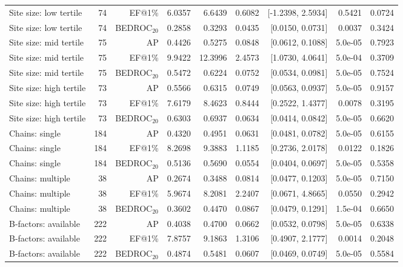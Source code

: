 \begin{table}[t]
\begin{tabular}{lrrrrrrrr}
Site size: low tertile & 74 & EF@1\% & 6.0357 & 6.6439 & 0.6082 & [-1.2398, 2.5934] & 0.5421 & 0.0724 \\
Site size: low tertile & 74 & BEDROC$_{20}$ & 0.2858 & 0.3293 & 0.0435 & [0.0150, 0.0731] & 0.0037 & 0.3424 \\
Site size: mid tertile & 75 & AP & 0.4426 & 0.5275 & 0.0848 & [0.0612, 0.1088] & 5.0e-05 & 0.7923 \\
Site size: mid tertile & 75 & EF@1\% & 9.9422 & 12.3996 & 2.4573 & [1.0730, 4.0641] & 5.0e-04 & 0.3709 \\
Site size: mid tertile & 75 & BEDROC$_{20}$ & 0.5472 & 0.6224 & 0.0752 & [0.0534, 0.0981] & 5.0e-05 & 0.7524 \\
Site size: high tertile & 73 & AP & 0.5566 & 0.6315 & 0.0749 & [0.0563, 0.0937] & 5.0e-05 & 0.9157 \\
Site size: high tertile & 73 & EF@1\% & 7.6179 & 8.4623 & 0.8444 & [0.2522, 1.4377] & 0.0078 & 0.3195 \\
Site size: high tertile & 73 & BEDROC$_{20}$ & 0.6303 & 0.6937 & 0.0634 & [0.0414, 0.0842] & 5.0e-05 & 0.6620 \\
Chains: single & 184 & AP & 0.4320 & 0.4951 & 0.0631 & [0.0481, 0.0782] & 5.0e-05 & 0.6155 \\
Chains: single & 184 & EF@1\% & 8.2698 & 9.3883 & 1.1185 & [0.2736, 2.0178] & 0.0122 & 0.1826 \\
Chains: single & 184 & BEDROC$_{20}$ & 0.5136 & 0.5690 & 0.0554 & [0.0404, 0.0697] & 5.0e-05 & 0.5358 \\
Chains: multiple & 38 & AP & 0.2674 & 0.3488 & 0.0814 & [0.0477, 0.1203] & 5.0e-05 & 0.7150 \\
Chains: multiple & 38 & EF@1\% & 5.9674 & 8.2081 & 2.2407 & [0.0671, 4.8665] & 0.0550 & 0.2942 \\
Chains: multiple & 38 & BEDROC$_{20}$ & 0.3602 & 0.4470 & 0.0867 & [0.0479, 0.1291] & 1.5e-04 & 0.6650 \\
B-factors: available & 222 & AP & 0.4038 & 0.4700 & 0.0662 & [0.0532, 0.0798] & 5.0e-05 & 0.6338 \\
B-factors: available & 222 & EF@1\% & 7.8757 & 9.1863 & 1.3106 & [0.4907, 2.1777] & 0.0014 & 0.2048 \\
B-factors: available & 222 & BEDROC$_{20}$ & 0.4874 & 0.5481 & 0.0607 & [0.0469, 0.0749] & 5.0e-05 & 0.5584 \\
\bottomrule
\end{tabular}
\end{table}
